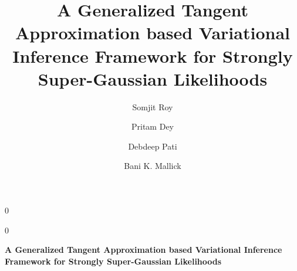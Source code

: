 \documentclass[12pt]{article}
\numberwithin{equation}{section}
\begin{document}
\def\spacingset#1{\renewcommand{\baselinestretch}%
{#1}\small\normalsize} \spacingset{1}


\newcommand{\anon}{0} %
\anon
{
  \title{\bf A Generalized Tangent Approximation based Variational Inference Framework for Strongly Super-Gaussian Likelihoods}
  \date{}
  \renewcommand\thefootnote{\fnsymbol{footnote}}
  \author[1,*,†]{Somjit Roy}
  \author[1,*]{Pritam Dey}
  \author[2]{Debdeep Pati}
  \author[1]{Bani K. Mallick}


  \maketitle
} \fi

\anon
{
  \bigskip
  \bigskip
  \bigskip
  \begin{center}
    {\LARGE\bf A Generalized Tangent Approximation based Variational Inference Framework for Strongly Super-Gaussian Likelihoods}
\end{center}
  \medskip
} \fi

\renewcommand\thefootnote{\arabic{footnote}}

\end{document}
